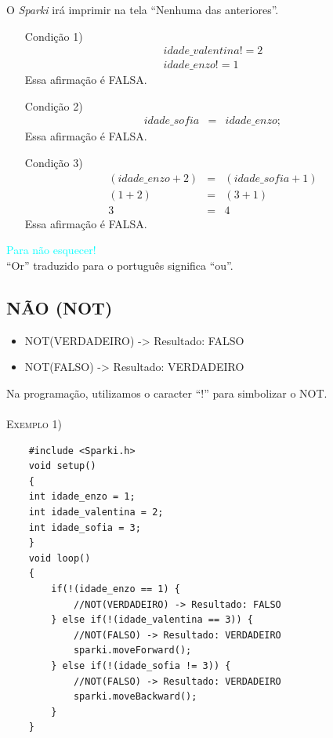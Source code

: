     O \textsl{Sparki} irá imprimir na tela ``Nenhuma das anteriores''.
    \begin{itemize}
        \item[Condição 1)] 
        \begin{eqnarray}
        idade\_valentina != 2\\
        idade\_enzo != 1 \nonumber
        \end{eqnarray}
        Essa afirmação é FALSA.
        \item[Condição 2)]
        \begin{eqnarray}
        idade\_sofia & = & idade\_enzo;
        \end{eqnarray}
        Essa afirmação é FALSA.
        \item[Condição 3)]
        \begin{eqnarray}
        (idade\_enzo + 2) & = & (idade\_sofia + 1)\\
        (1 + 2) & = & (3 + 1) \nonumber \\
        3 & = & 4 \nonumber
        \end{eqnarray}
        Essa afirmação é FALSA.
    \end{itemize}
     
    \begin{center}
        \textcolor{cyan}{Para não esquecer!}
        \\``Or'' traduzido para o português significa ``ou''.
    \end{center}
     
\subsection{NÃO (NOT)}

    \begin{itemize}
        \item NOT(VERDADEIRO) -> Resultado: FALSO
        \item NOT(FALSO) -> Resultado: VERDADEIRO
    \end{itemize}
    
    Na programação, utilizamos o caracter ``!'' para simbolizar o NOT.
    \\
    \\
     \textsc{Exemplo 1)}
     
     \begin{verbatim}
    #include <Sparki.h>
    void setup()
    {
    int idade_enzo = 1;
    int idade_valentina = 2;
    int idade_sofia = 3;
    }
    void loop()
    {
        if(!(idade_enzo == 1) {
            //NOT(VERDADEIRO) -> Resultado: FALSO
        } else if(!(idade_valentina == 3)) {
            //NOT(FALSO) -> Resultado: VERDADEIRO
            sparki.moveForward();
        } else if(!(idade_sofia != 3)) {
            //NOT(FALSO) -> Resultado: VERDADEIRO
            sparki.moveBackward();
        }
    }
    \end{verbatim}
    
